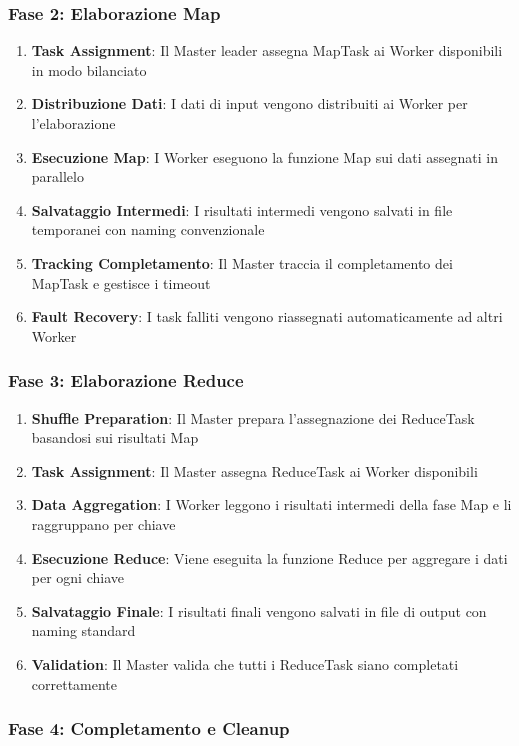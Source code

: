 \documentclass[12pt,a4paper]{article}
\begin{document}
\subsubsection{Fase 2: Elaborazione Map}

\begin{enumerate}
\item \textbf{Task Assignment}: Il Master leader assegna MapTask ai Worker disponibili in modo bilanciato
\item \textbf{Distribuzione Dati}: I dati di input vengono distribuiti ai Worker per l'elaborazione
\item \textbf{Esecuzione Map}: I Worker eseguono la funzione Map sui dati assegnati in parallelo
\item \textbf{Salvataggio Intermedi}: I risultati intermedi vengono salvati in file temporanei con naming convenzionale
\item \textbf{Tracking Completamento}: Il Master traccia il completamento dei MapTask e gestisce i timeout
\item \textbf{Fault Recovery}: I task falliti vengono riassegnati automaticamente ad altri Worker
\end{enumerate}

\subsubsection{Fase 3: Elaborazione Reduce}

\begin{enumerate}
\item \textbf{Shuffle Preparation}: Il Master prepara l'assegnazione dei ReduceTask basandosi sui risultati Map
\item \textbf{Task Assignment}: Il Master assegna ReduceTask ai Worker disponibili
\item \textbf{Data Aggregation}: I Worker leggono i risultati intermedi della fase Map e li raggruppano per chiave
\item \textbf{Esecuzione Reduce}: Viene eseguita la funzione Reduce per aggregare i dati per ogni chiave
\item \textbf{Salvataggio Finale}: I risultati finali vengono salvati in file di output con naming standard
\item \textbf{Validation}: Il Master valida che tutti i ReduceTask siano completati correttamente
\end{enumerate}

\subsubsection{Fase 4: Completamento e Cleanup}
\end{document}
